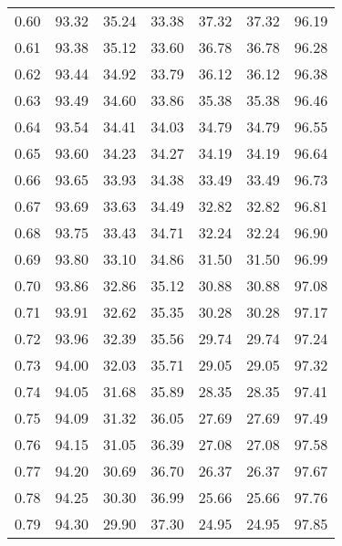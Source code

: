 \begin{tabular}{|c|c|c|c|c|c|c|}
      0.60 &     93.32 &     35.24 &      33.38 &   37.32 &      37.32 &         96.19 \\
      0.61 &     93.38 &     35.12 &      33.60 &   36.78 &      36.78 &         96.28 \\
      0.62 &     93.44 &     34.92 &      33.79 &   36.12 &      36.12 &         96.38 \\
      0.63 &     93.49 &     34.60 &      33.86 &   35.38 &      35.38 &         96.46 \\
      0.64 &     93.54 &     34.41 &      34.03 &   34.79 &      34.79 &         96.55 \\
      0.65 &     93.60 &     34.23 &      34.27 &   34.19 &      34.19 &         96.64 \\
      0.66 &     93.65 &     33.93 &      34.38 &   33.49 &      33.49 &         96.73 \\
      0.67 &     93.69 &     33.63 &      34.49 &   32.82 &      32.82 &         96.81 \\
      0.68 &     93.75 &     33.43 &      34.71 &   32.24 &      32.24 &         96.90 \\
      0.69 &     93.80 &     33.10 &      34.86 &   31.50 &      31.50 &         96.99 \\
      0.70 &     93.86 &     32.86 &      35.12 &   30.88 &      30.88 &         97.08 \\
      0.71 &     93.91 &     32.62 &      35.35 &   30.28 &      30.28 &         97.17 \\
      0.72 &     93.96 &     32.39 &      35.56 &   29.74 &      29.74 &         97.24 \\
      0.73 &     94.00 &     32.03 &      35.71 &   29.05 &      29.05 &         97.32 \\
      0.74 &     94.05 &     31.68 &      35.89 &   28.35 &      28.35 &         97.41 \\
      0.75 &     94.09 &     31.32 &      36.05 &   27.69 &      27.69 &         97.49 \\
      0.76 &     94.15 &     31.05 &      36.39 &   27.08 &      27.08 &         97.58 \\
      0.77 &     94.20 &     30.69 &      36.70 &   26.37 &      26.37 &         97.67 \\
      0.78 &     94.25 &     30.30 &      36.99 &   25.66 &      25.66 &         97.76 \\
      0.79 &     94.30 &     29.90 &      37.30 &   24.95 &      24.95 &         97.85 \\

\end{tabular}
